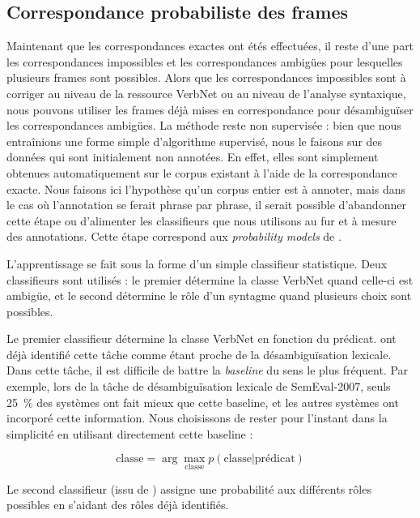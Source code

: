 \subsection{Correspondance probabiliste des frames}
\label{subsec:probability}

Maintenant que les correspondances exactes ont étés effectuées, il reste d'une
part les correspondances impossibles et les correspondances ambigües pour
lesquelles plusieurs frames sont possibles. Alors que les correspondances
impossibles sont à corriger au niveau de la ressource VerbNet ou au niveau de
l'analyse syntaxique, nous pouvons utiliser les frames déjà mises en
correspondance pour désambiguïser les correspondances ambigües. La méthode
reste non supervisée : bien que nous entraînions une forme simple d'algorithme
supervisé, nous le faisons sur des données qui sont initialement non annotées.
En effet, elles sont simplement obtenues automatiquement sur le corpus existant
à l'aide de la correspondance exacte. Nous faisons ici l'hypothèse qu'un corpus
entier est à annoter, mais dans le cas où l'annotation se ferait phrase par
phrase, il serait possible d'abandonner cette étape ou d'alimenter les
classifieurs que nous utilisons au fur et à mesure des annotations. Cette étape
correspond aux \emph{probability models} de \citet{swier2004unsupervised}.

L'apprentissage se fait sous la forme d'un simple classifieur statistique. Deux
classifieurs sont utilisés : le premier détermine la classe VerbNet quand
celle-ci est ambigüe, et le second détermine le rôle d'un syntagme quand
plusieurs choix sont possibles.

Le premier classifieur détermine la classe VerbNet en fonction du prédicat.
\citet{abend2008supervised} ont déjà identifié cette tâche comme étant proche
de la désambiguïsation lexicale. Dans cette tâche, il est difficile de battre
la \emph{baseline} du sens le plus fréquent. Par exemple, lors de la tâche de
désambiguïsation lexicale de SemEval-2007, seuls 25~\% des systèmes ont fait
mieux que cette baseline, et les autres systèmes ont incorporé cette
information. Nous choisissons de rester pour l'instant dans la simplicité en
utilisant directement cette baseline :

$$ \text{classe} = \arg\max_{\text{classe}} p(\text{classe} \vert \text{prédicat}) $$

Le second classifieur (issu de \cite{swier2004unsupervised}) assigne une
probabilité aux différents rôles possibles en s'aidant des rôles déjà
identifiés.

